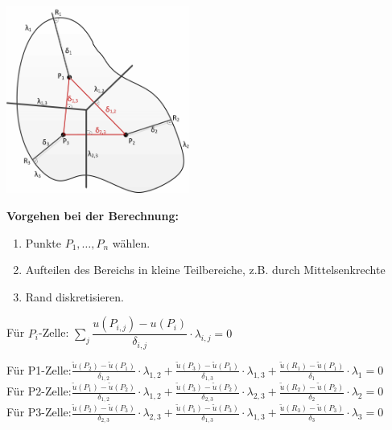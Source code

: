\begin{minipage}{6cm}
	\includegraphics[width=6cm]{Content/Numerik/FVM1.png}
\end{minipage}
\hfill
\begin{minipage}{12cm}
\textbf{Vorgehen bei der Berechnung:}\\
\begin{enumerate}
\item Punkte $P_1,\ldots,P_n$ wählen.
\item Aufteilen des Bereichs in kleine Teilbereiche, z.B. durch Mittelsenkrechte
\item Rand diskretisieren.\\
\end{enumerate}

Für $P_i$-Zelle: $\sum\limits_{j} \dfrac{u(P_{i,j}) - u(P_i)}{\delta_{i,j}} \cdot \lambda_{i,j} = 0$

Für P1-Zelle:\quad $\frac{\tilde{u}(P_2)-\tilde{u}(P_1)}{\delta_{1,2}}\cdot\lambda_{1,2}+\frac{\tilde{u}(P_3)-\tilde{u}(P_1)}{\delta_{1,3}}\cdot\lambda_{1,3}+\frac{\tilde{u}(R_1)-\tilde{u}(P_1)}{\delta_1}\cdot\lambda_1=0$\\

Für P2-Zelle:\quad $\frac{\tilde{u}(P_1)-\tilde{u}(P_2)}{\delta_{1,2}}\cdot\lambda_{1,2}+\frac{\tilde{u}(P_3)-\tilde{u}(P_2)}{\delta_{2,3}}\cdot\lambda_{2,3}+\frac{\tilde{u}(R_2)-\tilde{u}(P_2)}{\delta_2}\cdot\lambda_2=0$\\

Für P3-Zelle:\quad $\frac{\tilde{u}(P_2)-\tilde{u}(P_3)}{\delta_{2,3}}\cdot\lambda_{2,3}+\frac{\tilde{u}(P_1)-\tilde{u}(P_3)}{\delta_{1,3}}\cdot\lambda_{1,3}+\frac{\tilde{u}(R_3)-\tilde{u}(P_3)}{\delta_3}\cdot\lambda_3=0$\\
\end{minipage}

